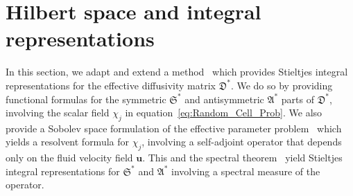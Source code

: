 \documentclass[english,12pt,jmp,graphicx]{revtex4-1}
\newcommand{\Pen}{\mbox{\textit{Pe}}}  %
\newcommand{\vecu}{\boldsymbol{u}}
\newcommand{\vecx}{\boldsymbol{x}}
\newcommand{\bnabla}{\mbox{\boldmath${\nabla}$}}
\newcommand{\bcdot}{\mbox{\boldmath${\cdot}$}}
\newcommand{\Sg}{\mathfrak{S}}
\newcommand{\Ag}{\mathfrak{A}}
\newcommand{\Dg}{\mathfrak{D}}
\begin{document}



\section{Hilbert space and integral representations} \label{sec:Integral_Reps_Sobolev}   
%
In this section, we adapt and extend a
method~\cite{Bhattacharya:AAP:1999:951,Bhattacharya:1989:ASD,Pavliotis:PHD_Thesis} which
provides Stieltjes integral representations for the effective
diffusivity matrix $\Dg^*$. We do so by providing functional formulas
for the symmetric $\Sg^*$ and antisymmetric $\Ag^*$ parts of $\Dg^*$,
involving the 
scalar field $\chi_j$ in equation~\eqref{eq:Random_Cell_Prob}. We also
provide a Sobolev space formulation of the effective parameter
problem~\cite{Pavliotis:PHD_Thesis} which yields a resolvent formula
for $\chi_j$, involving a self-adjoint 
operator that depends only on the fluid velocity field $\vecu$. This
and the spectral theorem~\cite{Stone:64,Reed-1980} yield Stieltjes
integral representations for $\Sg^*$ and $\Ag^*$ involving a spectral
measure of the operator.            
%
\end{document}
